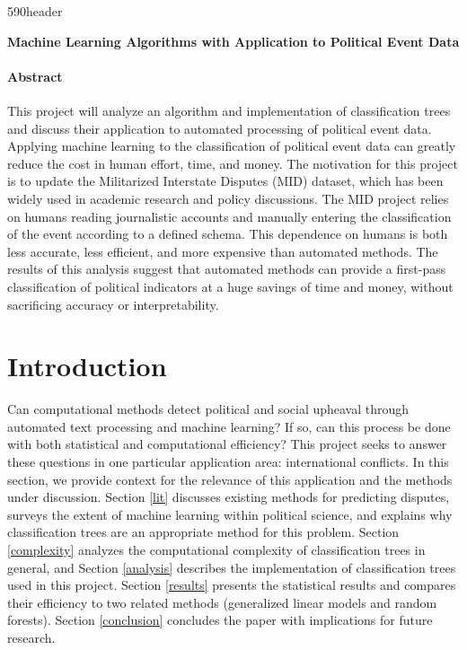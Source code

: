 \documentclass[12pt,letterpaper]{article}
\begin{document}
\cps590header

\vspace{1in}
\begin{center}
\textbf{Machine Learning Algorithms with Application to Political Event Data}
\end{center}

\vspace{1in}
\paragraph{Abstract} This project will analyze an algorithm and implementation of classification trees and discuss their application to automated processing of political event data. Applying machine learning to the classification of political event data can greatly reduce the cost in human effort, time, and money. The motivation for this project is to update the Militarized Interstate Disputes (MID) dataset, which has been widely used in academic research and policy discussions. The MID project relies on humans reading journalistic accounts and manually entering the classification of the event according to a defined schema. This dependence on humans is both less accurate, less efficient, and more expensive than automated methods. The results of this analysis suggest that automated methods can provide a first-pass classification of political indicators at a huge savings of time and money, without sacrificing accuracy or interpretability. 


\pagebreak
\doublespacing

\section{Introduction} %

Can computational methods detect political and social upheaval through automated text processing and machine learning? If so, can this process be done with both statistical and computational efficiency? This project seeks to answer these questions in one particular application area: international conflicts. In this section, we provide context for the relevance of this application and the methods under discussion. Section \ref{lit} discusses existing methods for predicting disputes, surveys the extent of machine learning within political science, and explains why classification trees are an appropriate method for this problem. Section \ref{complexity} analyzes the computational complexity of classification trees in general, and Section \ref{analysis} describes the implementation of classification trees used in this project. Section \ref{results} presents the statistical results and compares their efficiency to two related methods (generalized linear models and random forests). Section \ref{conclusion} concludes the paper with implications for future research. 
\end{document}
